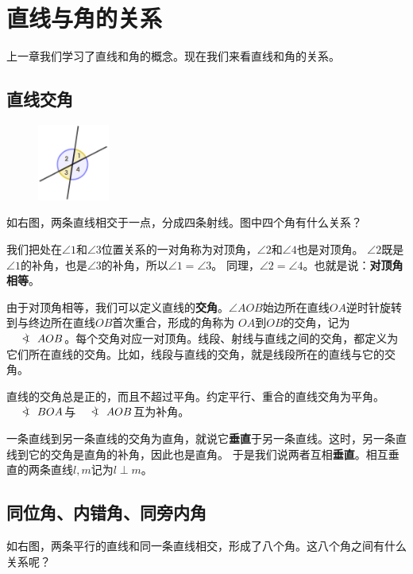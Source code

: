 \documentclass[12pt,UTF8]{ctexbook}
\newcommand{\arcangle}{\mathord{\mathpalette\doarcangle\relax}}
\newcommand{\doarcangle}[2]{%
  \hbox{%
    \sbox0{$#1B$}%
    \sbox2{$#1<$}%
    \raisebox{\dimexpr\dp0+(\ht0-\ht2)/2}{%
      $#1<\mspace{-9mu}\mathrel{)}\mspace{2mu}$%
    }%
  }%
}
\begin{document}
\chapter{直线与角的关系}
上一章我们学习了直线和角的概念。现在我们来看直线和角的关系。

\section{直线交角}
\begin{figure} %
    \vspace{-15pt}
    \includegraphics[width=0.21\textwidth]{角度0.png}
\end{figure}

如右图，两条直线相交于一点，分成四条射线。图中四个角有什么关系？

我们把处在$\angle 1$和$\angle 3$位置关系的一对角称为对顶角，$\angle 2$和$\angle 4$也是对顶角。
$\angle 2$既是$\angle 1$的补角，也是$\angle 3$的补角，所以$\angle 1 = \angle 3$。
同理，$\angle 2 = \angle 4$。也就是说：\textbf{对顶角相等}。

由于对顶角相等，我们可以定义直线的\textbf{交角}。$\angle AOB$始边所在直线$OA$逆时针旋转到与终边所在直线$OB$首次重合，形成的角称为
$OA$到$OB$的交角，记为$\arcangle AOB$。每个交角对应一对顶角。线段、射线与直线之间的交角，都定义为它们所在直线的交角。比如，线段与直线的交角，就是线段所在的直线与它的交角。

直线的交角总是正的，而且不超过平角。约定平行、重合的直线交角为平角。$\arcangle BOA$与$\arcangle AOB$互为补角。

一条直线到另一条直线的交角为直角，就说它\textbf{垂直}于另一条直线。这时，另一条直线到它的交角是直角的补角，因此也是直角。
于是我们说两者互相\textbf{垂直}。相互垂直的两条直线$l,m$记为$l\perp m$。


\section{同位角、内错角、同旁内角}
如右图，两条平行的直线和同一条直线相交，形成了八个角。这八个角之间有什么关系呢？
\end{document}
